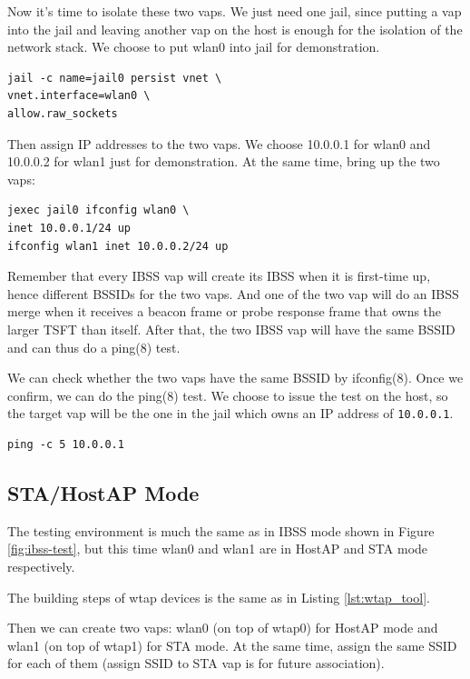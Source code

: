 \documentclass[conference]{IEEEtran}
\begin{document}
Now it's time to isolate these two vaps. We just need one jail, since putting a vap into the jail and leaving another vap on the host is enough for the isolation of the network stack. We choose to put wlan0 into jail for demonstration.

\begin{lstlisting}[caption=Jail, label={lst:jail}]
jail -c name=jail0 persist vnet \
vnet.interface=wlan0 \
allow.raw_sockets
\end{lstlisting}

Then assign IP addresses to the two vaps. We choose 10.0.0.1 for wlan0 and 10.0.0.2 for wlan1 just for demonstration. At the same time, bring up the two vaps:

\begin{lstlisting}[caption=Assign IP address, label={lst:IP}]
jexec jail0 ifconfig wlan0 \
inet 10.0.0.1/24 up
ifconfig wlan1 inet 10.0.0.2/24 up
\end{lstlisting}

Remember that every IBSS vap will create its IBSS when it is first-time up, hence different BSSIDs for the two vaps. And one of the two vap will do an IBSS merge when it receives a beacon frame or probe response frame that owns the larger TSFT than itself. After that, the two IBSS vap will have the same BSSID and can thus do a ping(8) test.

We can check whether the two vaps have the same BSSID by ifconfig(8). Once we confirm, we can do the ping(8) test. We choose to issue the test on the host, so the target vap will be the one in the jail which owns an IP address of \lstinline{10.0.0.1}.

\begin{lstlisting}[caption=Ping(8) test, label={lst:ping}]
ping -c 5 10.0.0.1
\end{lstlisting}

\subsection{STA/HostAP Mode}
The testing environment is much the same as in IBSS mode shown in Figure \ref{fig:ibss-test}, but this time wlan0 and wlan1 are in HostAP and STA mode respectively.

The building steps of wtap devices is the same as in Listing \ref{lst:wtap_tool}.

Then we can create two vaps: wlan0 (on top of wtap0) for HostAP mode and wlan1 (on top of wtap1) for STA mode. At the same time, assign the same SSID for each of them (assign SSID to STA vap is for future association).
\end{document}
